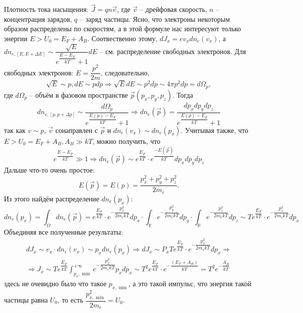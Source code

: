 Плотность тока насыщения: $\vec{J} = q n \vec{v}$, где $\vec{v}$ -- дрейфовая скорость, 
$n$ -- концентрация зарядов, $q$ -- заряд частицы. Ясно, что электроны некоторым образом
распределены по скоростям, а в этой формуле нас интересуют только энергии
$E > U_0 = E_F + A_B$. Соотвественно этому, $d J_x = e v_x dn_e (v_x)$, а
$dn_{e, [E, E+\Delta E]} \sim \dfrac{\sqrt{E}}{e^{\dfrac{E-E_F}{kT}} + 1} dE$ -- см.
распределение свободных электронов. Для свободных электронов: $E = \dfrac{p^2}{2m}$,
следовательно,
\[
  \sqrt{E} \sim p, dE \sim p dp \Rightarrow \sqrt{E} dE \sim p^2 dp \sim 4\pi p^2 dp = d \Omega_p,
\]
где $d\Omega_p$ -- объём в фазовом пространстве $\vec{p} (p_x, p_y, p_z)$. Тогда
\[
  dn_{e, [p, p+\Delta p]} \sim \dfrac{d\Omega_p}{e^{\dfrac{E(p) - E_F}{kT}} + 1}
\Rightarrow
  dn_e (\vec{p}) = \dfrac{dp_x dp_y dp_z}{e^{\dfrac{E(p) - E_F}{kT}} + 1}
\]
так как $v \sim p$, $\vec{v}$ сонаправлен с $\vec{p}$ и $dn_e (v_x) \sim dn_e(p_x)$.
Учитывая также, что $E > U_0 = E_F + A_B, A_B \gg kT$, можно получить, что 
\[
  e^{\dfrac{E-E_F}{kT}} \gg 1
  \Rightarrow
  dn_e (\vec{p}) \sim e^{\dfrac{E_F}{kT}} \cdot e^{\dfrac{- E(\vec{p})}{kT}} dp_x dp_y dp_z
\]
Дальше что-то очень простое:
\[
  E(\vec{p}) = E(p) = \dfrac{p_x^2 + p_y^2 + p_z^2}{2m_e}.
\]
Из этого найдём распределение $dn_e (p_x)$:
\[
  dn_e (p_x) = \int_\Omega dn_e (\vec{p}) = e^{\dfrac{E_F}{kT}} \cdot 
  e^{- \dfrac{p_x^2}{2m_e kT}} dp_x \cdot 
  \int_\mathbb{R} e^{- \dfrac{p_y^2}{2m_e kT}} dp_y \cdot 
  \int_\mathbb{R} e^{- \dfrac{p_z^2}{2m_e kT}} dp_z
  \sim T e^{\dfrac{E_F}{kT}} \cdot e^{-\dfrac{p_x^2}{2m_e kT}} dp_x
\]
Объединяя все полученные результаты:
\begin{multline*}
  dJ_x \sim v_x \cdot dn_e (v_x) \sim p_x dn_e (p_x)
  \Rightarrow
  dJ_x \sim P_x T e^{\dfrac{E_F}{kT}} \cdot e^{-\dfrac{p_x^2}{2m_e kT}} dp_x
  \Rightarrow \\
  \Rightarrow
  J_x \sim T e^{\dfrac{E_F}{kT}} \int_{p_x, \min}^{+\infty} e^{-\dfrac{p_x^2}{2m_e kT}} p_x dp_x
  \sim T^2 e^{\dfrac{E_F}{kT}} \cdot e^{-\dfrac{(E_F + A_B)}{kT}}
  = T^2 e^{- \dfrac{A_B}{kT}}
\end{multline*}
здесь не очевидно было что такое $p_{x, \min}$, а это такой импульс, что энергия такой частицы
равна $U_0$, то есть $\dfrac{p_{x, \min}^2}{2m_e} = U_0$.
